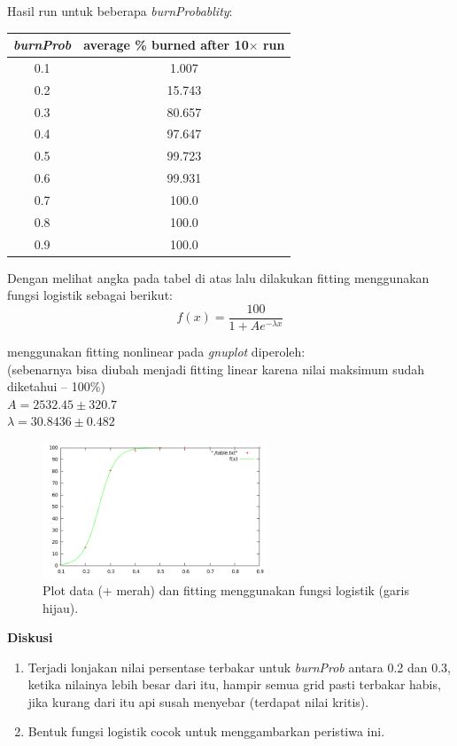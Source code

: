 \documentclass[paper=a4, fontsize=11pt]{scrartcl}
\numberwithin{equation}{section} %
\numberwithin{figure}{section} %
\numberwithin{table}{section} %
\begin{document}
\newpage
Hasil run untuk beberapa \textit{burnProbablity}:
\begin{table}[ht]
\begin{tabular}{c c}
\hline
\textit{burnProb} & average \% burned after 10$\times$ run \\ [0.5ex]
\hline 
0.1 & 1.007 \\
0.2 & 15.743 \\
0.3 & 80.657 \\
0.4 & 97.647 \\
0.5 & 99.723 \\
0.6 & 99.931 \\
0.7 & 100.0 \\
0.8 & 100.0 \\
0.9 & 100.0 \\ [1ex]
\hline 
\end{tabular}
\end{table}

Dengan melihat angka pada tabel di atas lalu dilakukan fitting menggunakan fungsi logistik sebagai berikut:
\begin{equation}
f(x) = \frac{100}{1 + A e^{-\lambda x}}
\end{equation}

menggunakan fitting nonlinear pada \textit{gnuplot} diperoleh: \\
(sebenarnya bisa diubah menjadi fitting linear karena nilai maksimum sudah diketahui \--- 100\%)\\
$ A = 2532.45 \pm 320.7 $\\
$ \lambda = 30.8436 \pm 0.482$
\begin{figure}
	\centering
	\includegraphics[width=0.6\textwidth]{plot.png}
	\caption{Plot data (+ merah) dan fitting menggunakan fungsi logistik (garis hijau).}
\end{figure}
 
\textbf{Diskusi}
\begin{enumerate}
\item Terjadi lonjakan nilai persentase terbakar untuk \textit{burnProb} antara 0.2 dan 0.3, ketika nilainya lebih besar dari itu, hampir semua grid pasti terbakar habis, jika kurang dari itu api susah menyebar (terdapat nilai kritis).
\item Bentuk fungsi logistik cocok untuk menggambarkan peristiwa ini.
\end{enumerate}
\end{document}
